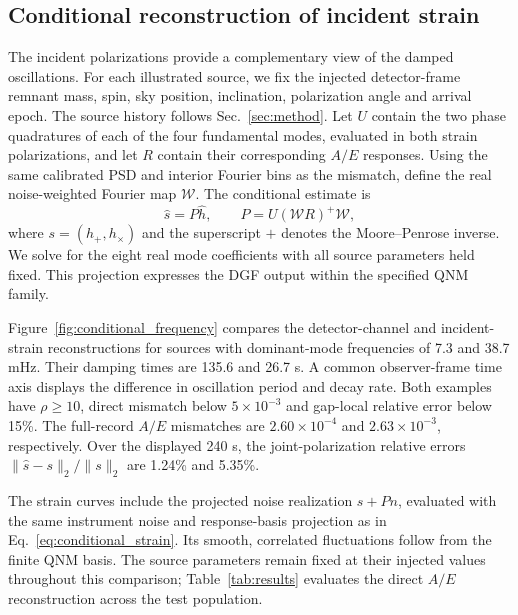 \documentclass[10pt,prd,aps,a4paper,twocolumn,superscriptaddress,nofootinbib,floatfix]{revtex4-2}
\begin{document}
\subsection{Conditional reconstruction of incident strain}\label{subsec:incident_strain}
The incident polarizations provide a complementary view of the damped oscillations. For each illustrated source, we fix the injected detector-frame remnant mass, spin, sky position, inclination, polarization angle and arrival epoch. The source history follows Sec.~\ref{sec:method}. Let $U$ contain the two phase quadratures of each of the four fundamental modes, evaluated in both strain polarizations, and let $R$ contain their corresponding $A/E$ responses. Using the same calibrated PSD and interior Fourier bins as the mismatch, define the real noise-weighted Fourier map $\mathcal W$. The conditional estimate is
\begin{equation}
\widehat s=P\widehat h,\qquad P=U(\mathcal W R)^+\mathcal W,\label{eq:conditional_strain}
\end{equation}
where $s=(h_+,h_\times)$ and the superscript $+$ denotes the Moore--Penrose inverse. We solve for the eight real mode coefficients with all source parameters held fixed. This projection expresses the DGF output within the specified QNM family.

Figure~\ref{fig:conditional_frequency} compares the detector-channel and incident-strain reconstructions for sources with dominant-mode frequencies of 7.3 and 38.7 mHz. Their damping times are 135.6 and 26.7 s. A common observer-frame time axis displays the difference in oscillation period and decay rate. Both examples have $\rho\ge10$, direct mismatch below $5\times10^{-3}$ and gap-local relative error below 15\%. The full-record $A/E$ mismatches are $2.60\times10^{-4}$ and $2.63\times10^{-3}$, respectively. Over the displayed 240 s, the joint-polarization relative errors $\|\widehat s-s\|_2/\|s\|_2$ are 1.24\% and 5.35\%.

The strain curves include the projected noise realization $s+Pn$, evaluated with the same instrument noise and response-basis projection as in Eq.~\eqref{eq:conditional_strain}. Its smooth, correlated fluctuations follow from the finite QNM basis. The source parameters remain fixed at their injected values throughout this comparison; Table~\ref{tab:results} evaluates the direct $A/E$ reconstruction across the test population.
\end{document}

